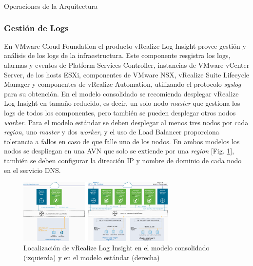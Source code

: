 \begin{subsection}{Operaciones de la Arquitectura\cite{CFopermanagement}}
\subsubsection{Gestión de Logs}
En VMware Cloud Foundation el producto vRealize Log Insight provee gestión y análisis de los logs de la infraestructura. Este componente resgistra los logs, alarmas y eventos de Platform Services Controller, instancias de VMware vCenter Server, de los hosts ESXi, componentes de VMware NSX, vRealize Suite Lifecycle Manager y componentes de vRealize Automation, utilizando el protocolo \textit{syslog} para su obtención. En el modelo consolidado se recomienda desplegar vRealize Log Insight en tamaño reducido, es decir, un solo nodo \textit{master} que gestiona los logs de todos los componentes, pero también se pueden desplegar otros nodos \textit{worker}. Para el modelo estándar se deben desplegar al menos tres nodos por cada \textit{region}, uno \textit{master} y dos \textit{worker}, y el uso de Load Balancer proporciona tolerancia a fallos en caso de que falle uno de los nodos. En ambos modelos los nodos se despliegan en una AVN que solo se extiende por una \textit{region} [Fig. \ref{fig:redLogIsight}], también se deben configurar la dirección IP y nombre de dominio de cada nodo en el servicio DNS.
    \begin{figure}[h!]
  \centering
  \includegraphics[width=0.7\textwidth]{imaxes/conceptosPrevios/networkLogInsight.png}
  \caption{Localización de vRealize Log Insight en el modelo consolidado (izquierda) y en el modelo estándar (derecha)}
  \label{fig:redLogIsight}
\end{figure}
\FloatBarrier
\end{subsection}
